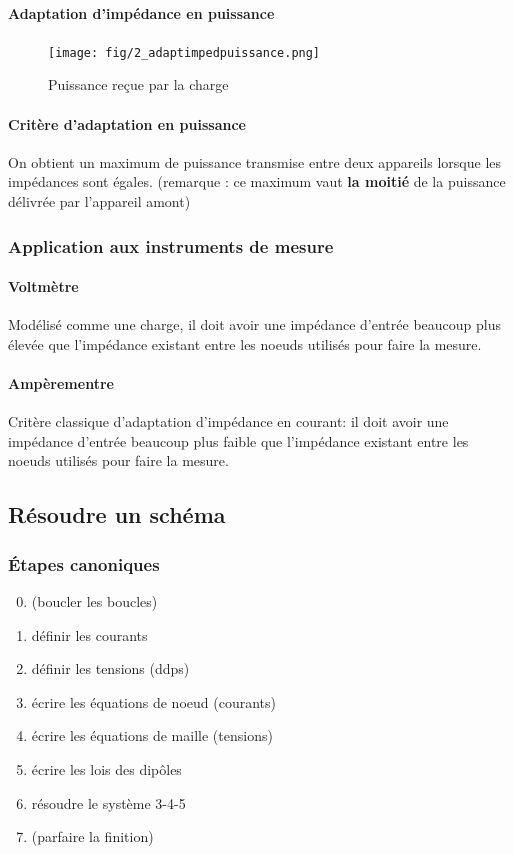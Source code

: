 \documentclass[a4paper]{article}
\begin{document}
    \paragraph{Adaptation d'impédance en puissance}
    \begin{figure}[H]
        \begin{center}
            \texttt{[image: fig/2\_adaptimpedpuissance.png]}
            \caption{Puissance reçue par la charge}
            \label{fig:2_adaptimpedpuissance}
        \end{center}
    \end{figure}

    \paragraph{Critère d'adaptation en puissance} On obtient un maximum de puissance
    transmise entre deux appareils lorsque les impédances sont égales. (remarque :
    ce maximum vaut \textbf{la moitié} de la puissance délivrée par l'appareil amont)

    \subsubsection{Application aux instruments de mesure}
    \paragraph{Voltmètre} Modélisé comme une charge, il doit avoir une
    impédance d'entrée beaucoup plus élevée que l'impédance existant entre les 
    noeuds utilisés pour faire la mesure.

    \paragraph{Ampèrementre} Critère classique d'adaptation d'impédance en courant:
    il doit avoir une impédance d'entrée beaucoup plus faible que l'impédance
    existant entre les noeuds utilisés pour faire la mesure.


    \subsection{Résoudre un schéma}
    \subsubsection{\'Etapes canoniques}
    \begin{enumerate}
        \setcounter{enumi}{-1}
        \item (boucler les boucles)
        \item définir les courants
        \item définir les tensions (ddps)
        \item écrire les équations de noeud (courants)
        \item écrire les équations de maille (tensions)
        \item écrire les lois des dipôles
        \item résoudre le système 3-4-5
        \item (parfaire la finition)
    \end{enumerate}
\end{document}
